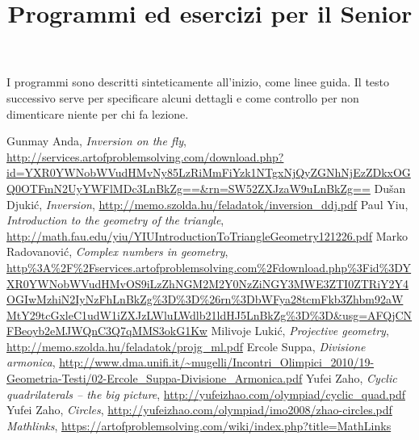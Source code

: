 \documentclass[a4paper,10pt]{article}
\title{Programmi ed esercizi per il Senior}
\date{}
\begin{document}
\maketitle


I programmi sono descritti sinteticamente all'inizio, come linee guida. Il testo successivo serve per specificare alcuni dettagli e come controllo per non dimenticare niente per chi fa lezione. 

\vspace{1cm}
 
 \clearpage
 
 
 \clearpage
 
 
 \clearpage 

 \begin{thebibliography}{9}
	\bibitem[1]{} Gunmay Anda, \emph{Inversion on the fly}, \url{http://services.artofproblemsolving.com/download.php?id=YXR0YWNobWVudHMvNy85LzRiMmFiYzk1NTgxNjQyZGNhNjEzZDkxOGQ0OTFmN2UyYWFlMDc3LnBkZg==&rn=SW52ZXJzaW9uLnBkZg==}
	\bibitem[2]{} Du\v{s}an Djuki\' c, \emph{Inversion}, \url{http://memo.szolda.hu/feladatok/inversion_ddj.pdf}
	\bibitem[3]{} Paul Yiu, \emph{Introduction to the geometry of the triangle}, \url{http://math.fau.edu/yiu/YIUIntroductionToTriangleGeometry121226.pdf}
	\bibitem[4]{} Marko Radovanovi\'c, \emph{Complex numbers in geometry}, \url{http\%3A\%2F\%2Fservices.artofproblemsolving.com\%2Fdownload.php\%3Fid\%3DYXR0YWNobWVudHMvOS9iLzZhNGM2M2Y0NzZiNGY3MWE3ZTI0ZTRiY2Y4OGIwMzhiN2IyNzFhLnBkZg\%3D\%3D\%26rn\%3DbWFya28tcmFkb3Zhbm92aWMtY29tcGxleC1udW1iZXJzLWluLWdlb21ldHJ5LnBkZg\%3D\%3D&usg=AFQjCNFBeoyb2eMJWQnC3Q7qMMS3okG1Kw}
	\bibitem[5]{} Milivoje Luki\'c, \emph{Projective geometry}, \url{http://memo.szolda.hu/feladatok/projg_ml.pdf}
	\bibitem[6]{} Ercole Suppa, \emph{Divisione armonica}, \url{http://www.dma.unifi.it/~mugelli/Incontri_Olimpici_2010/19-Geometria-Testi/02-Ercole_Suppa-Divisione_Armonica.pdf}
	\bibitem[7]{} Yufei Zaho, \emph{Cyclic quadrilaterals -- the big picture}, \url{http://yufeizhao.com/olympiad/cyclic_quad.pdf}
	\bibitem[8]{} Yufei Zaho, \emph{Circles}, \url{http://yufeizhao.com/olympiad/imo2008/zhao-circles.pdf}
	\bibitem[9]{} \emph{Mathlinks}, \url{https://artofproblemsolving.com/wiki/index.php?title=MathLinks}
\end{thebibliography}
 
 
\end{document}
